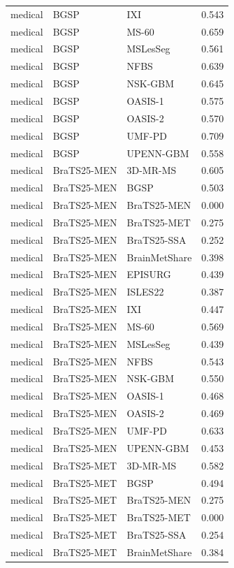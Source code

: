 \begin{tabular}{lllr}
medical & BGSP & IXI & 0.543 \\
medical & BGSP & MS-60 & 0.659 \\
medical & BGSP & MSLesSeg & 0.561 \\
medical & BGSP & NFBS & 0.639 \\
medical & BGSP & NSK-GBM & 0.645 \\
medical & BGSP & OASIS-1 & 0.575 \\
medical & BGSP & OASIS-2 & 0.570 \\
medical & BGSP & UMF-PD & 0.709 \\
medical & BGSP & UPENN-GBM & 0.558 \\
medical & BraTS25-MEN & 3D-MR-MS & 0.605 \\
medical & BraTS25-MEN & BGSP & 0.503 \\
medical & BraTS25-MEN & BraTS25-MEN & 0.000 \\
medical & BraTS25-MEN & BraTS25-MET & 0.275 \\
medical & BraTS25-MEN & BraTS25-SSA & 0.252 \\
medical & BraTS25-MEN & BrainMetShare & 0.398 \\
medical & BraTS25-MEN & EPISURG & 0.439 \\
medical & BraTS25-MEN & ISLES22 & 0.387 \\
medical & BraTS25-MEN & IXI & 0.447 \\
medical & BraTS25-MEN & MS-60 & 0.569 \\
medical & BraTS25-MEN & MSLesSeg & 0.439 \\
medical & BraTS25-MEN & NFBS & 0.543 \\
medical & BraTS25-MEN & NSK-GBM & 0.550 \\
medical & BraTS25-MEN & OASIS-1 & 0.468 \\
medical & BraTS25-MEN & OASIS-2 & 0.469 \\
medical & BraTS25-MEN & UMF-PD & 0.633 \\
medical & BraTS25-MEN & UPENN-GBM & 0.453 \\
medical & BraTS25-MET & 3D-MR-MS & 0.582 \\
medical & BraTS25-MET & BGSP & 0.494 \\
medical & BraTS25-MET & BraTS25-MEN & 0.275 \\
medical & BraTS25-MET & BraTS25-MET & 0.000 \\
medical & BraTS25-MET & BraTS25-SSA & 0.254 \\
medical & BraTS25-MET & BrainMetShare & 0.384 \\

\end{tabular}
